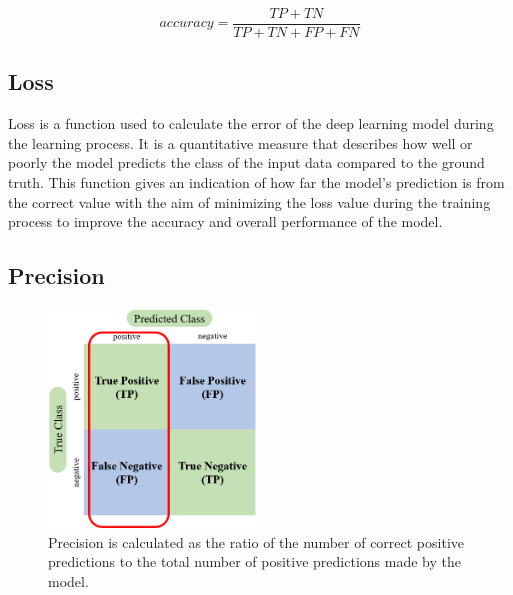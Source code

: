 \begin{equation}
    \label{equ:accuracy}
    accuracy=\frac{TP+TN}{TP+TN+FP+FN}
\end{equation}

\subsection{Loss}
\label{equ:loss}
Loss is a function used to calculate the error of the deep learning model during the learning process. It is a quantitative measure that describes how well or poorly the model predicts the class of the input data compared to the ground truth. This function gives an indication of how far the model's prediction is from the correct value with the aim of minimizing the loss value during the training process to improve the accuracy and overall performance of the model.

\subsection{Precision}
\label{subsec3: precision}

\begin{figure}[h!]
    \centering
    \includegraphics[width=0.5\textwidth]{bab2/ar_Precision.png}
    \caption{Precision is calculated as the ratio of the number of correct positive predictions to the total number of positive predictions made by the model.}
    \label{fig:MetricPrecision}
\end{figure}

